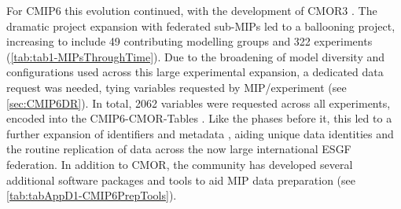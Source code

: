 \documentclass[gmd, preprint]{copernicus}
\begin{document}
For CMIP6 this evolution continued, with the development of CMOR3 \citep{mauzey_cmor_2024}. The dramatic project expansion with federated sub-MIPs led to a ballooning project, increasing to include 49 contributing modelling groups and 322 experiments (\autoref{tab:tab1-MIPsThroughTime}). Due to the broadening of model diversity and configurations used across this large experimental expansion, a dedicated data request was needed, tying variables requested by MIP/experiment (see \autoref{sec:CMIP6DR}). In total, 2062 variables were requested across all experiments, encoded into the CMIP6-CMOR-Tables \citep{nadeau_cmip6_2017}. Like the phases before it, this led to a further expansion of identifiers and metadata \citep{taylor_pcmdi_2018}, aiding unique data identities and the routine replication of data across the now large international ESGF federation. In addition to CMOR, the community has developed several additional software packages and tools to aid MIP data preparation (see \autoref{tab:tabAppD1-CMIP6PrepTools}).
\end{document}
